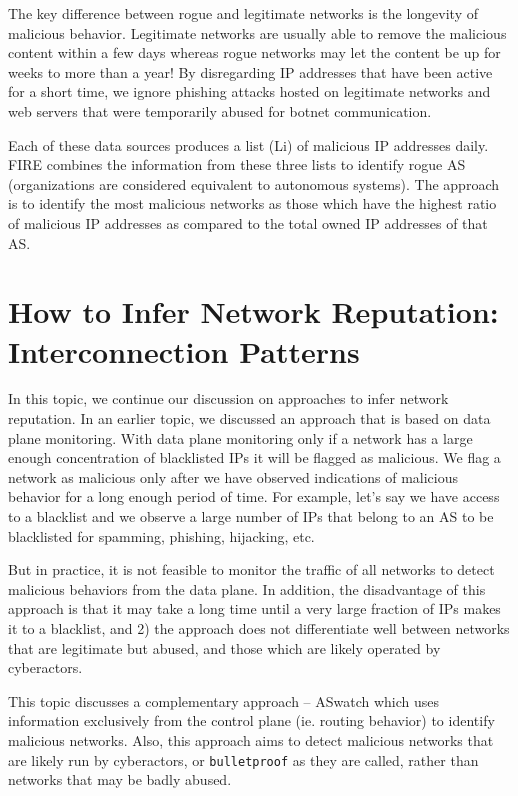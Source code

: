 \documentclass[11pt]{article}
\begin{document}
The key difference between rogue and legitimate networks is the longevity of malicious behavior. Legitimate networks are usually able to remove the malicious content within a few days whereas rogue networks may let the content be up for weeks to more than a year! By disregarding IP addresses that have been active for a short time, we ignore phishing attacks hosted on legitimate networks and web servers that were temporarily abused for botnet communication. 

Each of these data sources produces a list (Li) of malicious IP addresses daily. FIRE combines the information from these three lists to identify rogue AS (organizations are considered equivalent to autonomous systems). The approach is to identify the most malicious networks as those which have the highest ratio of malicious IP addresses as compared to the total owned IP addresses of that AS. 

\section{How to Infer Network Reputation: Interconnection Patterns}
\label{sec:org763967c}

In this topic, we continue our discussion on approaches to infer network reputation. In an earlier topic, we discussed an approach that is based on data plane monitoring. With data plane monitoring only if a network has a large enough concentration of blacklisted IPs it will be flagged as malicious. We flag a network as malicious only after we have observed indications of malicious behavior for a long enough period of time. For example, let's say we have access to a blacklist and we observe a large number of IPs that belong to an AS to be blacklisted for spamming, phishing, hijacking, etc. 

But in practice, it is not feasible to monitor the traffic of all networks to detect malicious behaviors from the data plane. In addition, the disadvantage of this approach is that it may take a long time until a very large fraction of IPs makes it to a blacklist, and 2) the approach does not differentiate well between networks that are legitimate but abused, and those which are likely operated by cyberactors. 

This topic discusses a complementary approach – ASwatch which uses information exclusively from the control plane (ie. routing behavior) to identify malicious networks. Also, this approach aims to detect malicious networks that are likely run by cyberactors, or \texttt{bulletproof} as they are called, rather than networks that may be badly abused.
\end{document}
